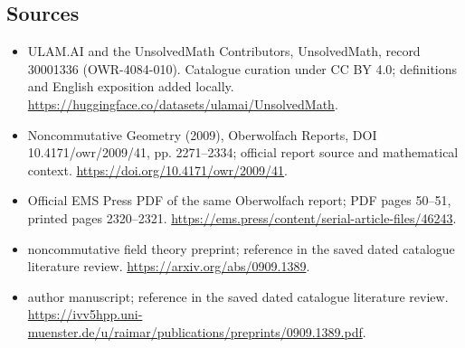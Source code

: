 \documentclass[11pt]{article}
\begin{document}
\subsection{Sources}
\begin{itemize}
\item[\hypertarget{source:30001336:1}{S1}] ULAM.AI and the UnsolvedMath Contributors, UnsolvedMath, record 30001336 (OWR-4084-010). Catalogue curation under CC BY 4.0; definitions and English exposition added locally.
\url{https://huggingface.co/datasets/ulamai/UnsolvedMath}.
\item[\hypertarget{source:30001336:2}{S2}] Noncommutative Geometry (2009), Oberwolfach Reports, DOI 10.4171/owr/2009/41, pp. 2271--2334; official report source and mathematical context.
\url{https://doi.org/10.4171/owr/2009/41}.
\item[\hypertarget{source:30001336:3}{S3}] Official EMS Press PDF of the same Oberwolfach report; PDF pages 50--51, printed pages 2320--2321.
\url{https://ems.press/content/serial-article-files/46243}.
\item[\hypertarget{source:30001336:4}{S4}] noncommutative field theory preprint; reference in the saved dated catalogue literature review.
\url{https://arxiv.org/abs/0909.1389}.
\item[\hypertarget{source:30001336:5}{S5}] author manuscript; reference in the saved dated catalogue literature review.
\url{https://ivv5hpp.uni-muenster.de/u/raimar/publications/preprints/0909.1389.pdf}.
\end{itemize}
\label{end:30001336}
\end{document}
